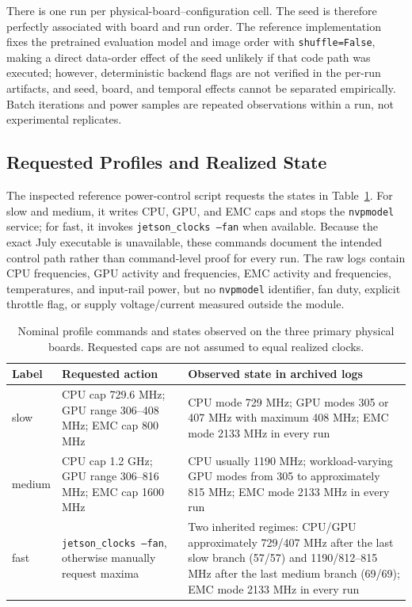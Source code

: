 \documentclass[electronics,article,submit,pdftex,moreauthors]{Definitions/mdpi}
\renewcommand{\tabref}[1]{Table~\ref{#1}}
\begin{document}
There is one run per physical-board--configuration cell. The seed is therefore perfectly associated with board and run order. The reference implementation fixes the pretrained evaluation model and image order with \texttt{shuffle=False}, making a direct data-order effect of the seed unlikely if that code path was executed; however, deterministic backend flags are not verified in the per-run artifacts, and seed, board, and temporal effects cannot be separated empirically. Batch iterations and power samples are repeated observations within a run, not experimental replicates.

\subsection{Requested Profiles and Realized State}

The inspected reference power-control script requests the states in \tabref{tab:profiles}. For slow and medium, it writes CPU, GPU, and EMC caps and stops the \texttt{nvpmodel} service; for fast, it invokes \texttt{jetson\_clocks --fan} when available. Because the exact July executable is unavailable, these commands document the intended control path rather than command-level proof for every run. The raw logs contain CPU frequencies, GPU activity and frequencies, EMC activity and frequencies, temperatures, and input-rail power, but no \texttt{nvpmodel} identifier, fan duty, explicit throttle flag, or supply voltage/current measured outside the module.

\begin{table}[t]
\caption{Nominal profile commands and states observed on the three primary physical boards. Requested caps are not assumed to equal realized clocks.}
\label{tab:profiles}
\centering
\small
\begin{tabularx}{\textwidth}{l>{\raggedright\arraybackslash}X>{\raggedright\arraybackslash}X}
\toprule
Label & Requested action & Observed state in archived logs \\
\midrule
slow & CPU cap 729.6 MHz; GPU range 306--408 MHz; EMC cap 800 MHz & CPU mode 729 MHz; GPU modes 305 or 407 MHz with maximum 408 MHz; EMC mode 2133 MHz in every run \\
\addlinespace[3pt]
medium & CPU cap 1.2 GHz; GPU range 306--816 MHz; EMC cap 1600 MHz & CPU usually 1190 MHz; workload-varying GPU modes from 305 to approximately 815 MHz; EMC mode 2133 MHz in every run \\
\addlinespace[3pt]
fast & \texttt{jetson\_clocks --fan}, otherwise manually request maxima & Two inherited regimes: CPU/GPU approximately 729/407 MHz after the last slow branch (57/57) and 1190/812--815 MHz after the last medium branch (69/69); EMC mode 2133 MHz in every run \\
\bottomrule
\end{tabularx}
\end{table}
\end{document}

